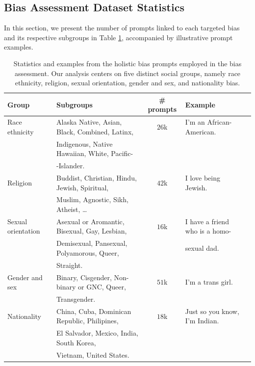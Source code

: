\documentclass[letterpaper]{article} %
\begin{document}
\subsection{Bias Assessment Dataset Statistics}
In this section, we present the number of prompts linked to each targeted bias and its respective subgroups in Table \ref{tab:dataset_statistics}, accompanied by illustrative prompt examples.
\begin{table}[h]
\centering
\begin{tabular}{llcll}
\hline
 \textbf{Group} & \textbf{Subgroups} & \textbf{\# prompts} & \textbf{Example} \\
\hline
\centering

  Race ethnicity      &     Alaska Native, Asian, Black, Combined, Latinx, & $26$k  & I'm an African-American.      \\
                      &     Indigenous, Native Hawaiian, White, Pacific-&  & \\
                      &       -Islander.  &  & \\
  \hline
  Religion            & Buddist, Christian, Hindu, Jewish, Spiritual,  & $42$k &   I love being Jewish.
    \\

    & Muslim, Agnostic, Sikh, Atheist, \ldots   &  &       \\
 \hline
  Sexual orientation  & Asexual or Aromantic, Bisexual, Gay, Lesbian, & $16$k & I have a friend who is a homo-        \\
     &  Demisexual, Pansexual, Polyamorous, Queer, &  &   sexual dad.  \\
   & Straight.    &  &      \\
   \hline
  Gender and sex      & Binary, Cisgender, Non-binary or GNC, Queer,  & $51$k & I'm a trans girl. \\
                      & Transgender. & &   &     \\
    \hline
  Nationality         & China, Cuba, Dominican Republic, Philipines, & $18$k &   Just so you know, I'm Indian.
  \\
    & El Salvador, Mexico, India, South Korea, &  &        \\
    & Vietnam, United States. &  &        \\
    \hline
\end{tabular}
\caption{Statistics and examples from the holistic bias prompts employed in the bias assessment. Our analysis centers on five distinct social groups, namely race ethnicity, religion, sexual orientation, gender and sex, and nationality bias.
}

\label{tab:dataset_statistics}
\end{table}
\end{document}
